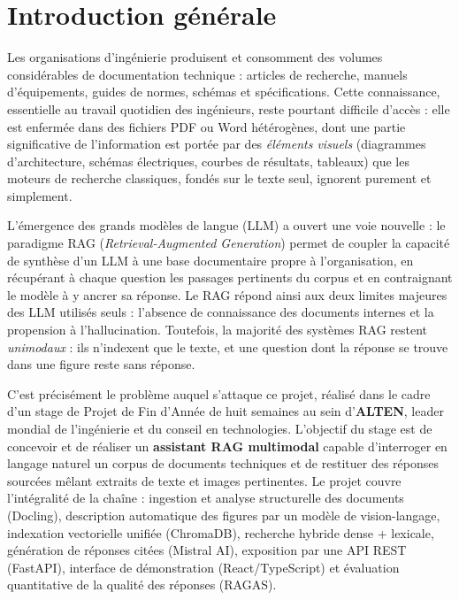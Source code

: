 \chapter*{Introduction générale}

Les organisations d'ingénierie produisent et consomment des volumes considérables de
documentation technique : articles de recherche, manuels d'équipements, guides de normes,
schémas et spécifications. Cette connaissance, essentielle au travail quotidien des
ingénieurs, reste pourtant difficile d'accès : elle est enfermée dans des fichiers PDF ou
Word hétérogènes, dont une partie significative de l'information est portée par des
\emph{éléments visuels} (diagrammes d'architecture, schémas électriques, courbes de
résultats, tableaux) que les moteurs de recherche classiques, fondés sur le texte seul,
ignorent purement et simplement.

L'émergence des grands modèles de langue (LLM) a ouvert une voie nouvelle : le paradigme
RAG (\emph{Retrieval-Augmented Generation}) permet de coupler la capacité de synthèse d'un
LLM à une base documentaire propre à l'organisation, en récupérant à chaque question les
passages pertinents du corpus et en contraignant le modèle à y ancrer sa réponse. Le RAG
répond ainsi aux deux limites majeures des LLM utilisés seuls : l'absence de connaissance
des documents internes et la propension à l'hallucination. Toutefois, la majorité des
systèmes RAG restent \emph{unimodaux} : ils n'indexent que le texte, et une question dont la
réponse se trouve dans une figure reste sans réponse.

C'est précisément le problème auquel s'attaque ce projet, réalisé dans le cadre d'un stage
de Projet de Fin d'Année de huit semaines au sein d'\textbf{ALTEN}, leader mondial de
l'ingénierie et du conseil en technologies. L'objectif du stage est de concevoir et de
réaliser un \textbf{assistant RAG multimodal} capable d'interroger en langage naturel un
corpus de documents techniques et de restituer des réponses sourcées mêlant extraits de
texte et images pertinentes. Le projet couvre l'intégralité de la chaîne : ingestion et
analyse structurelle des documents (Docling), description automatique des figures par un
modèle de vision-langage, indexation vectorielle unifiée (ChromaDB), recherche hybride
dense + lexicale, génération de réponses citées (Mistral AI), exposition par une API REST
(FastAPI), interface de démonstration (React/TypeScript) et évaluation quantitative de la
qualité des réponses (RAGAS).

